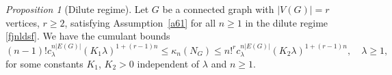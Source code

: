 \documentclass[bj,authoryear,noshowframe]{imsart}
\theoremstyle{plain}
\theoremstyle{remark}
\newtheorem{prop}{Proposition}[section]
\begin{document}
\begin{prop}[Dilute regime]
\label{t1}
Let $G$ be a connected graph with $|V(G)| = r$ vertices, $r\geq 2$, 
satisfying
Assumption~\ref{a61} for all $n\geq 1$
in the dilute regime \eqref{fjnldsf}. 
  We have the cumulant bounds 
\begin{equation}
\label{equiv-1}
 (n-1)! c_\lambda^{n |E(G)| } ( K_1 \lambda )^{1+(r-1)n}
 \leq 
 \kappa_n(N_G)
 \leq 
 n!^r c_\lambda^{n |E(G) |} ( K_2 \lambda )^{1+(r-1)n},
 \quad \lambda \geq 1, 
\end{equation}
for some constants $K_1$, $K_2>0$ independent of $\lambda$ and $n\geq 1$.
\end{prop} 
\end{document}
